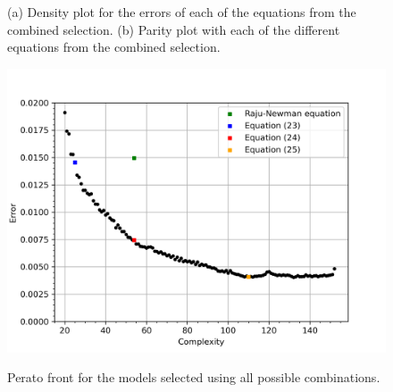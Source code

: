 \begin{figure}%
    \centering
    \qquad
    \caption{(a) Density plot for the errors of each of the equations from the combined selection. (b) Parity plot with each of the different equations from the combined selection.}%
    \label{fig:combo_error_plots}%
\end{figure}


\begin{figure}
    \centering
    \includegraphics[width=5in]{Figures/perato_front_everything.png}
    \label{fig:perato_front_everything}
    \caption{Perato front for the models selected using all possible combinations.}
\end{figure}


